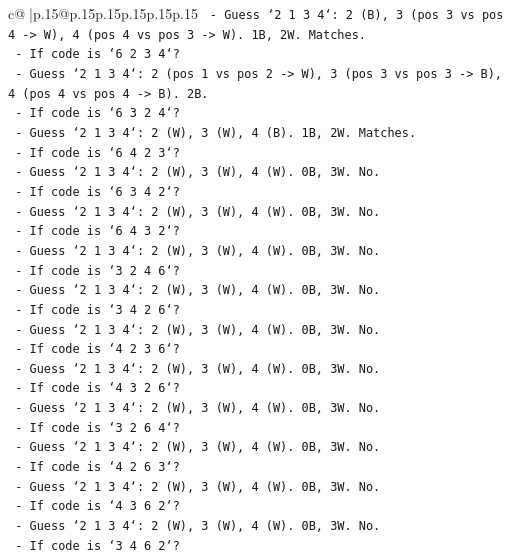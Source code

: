 \documentclass{article}
\begin{document}
{\begin{supertabular}{c@{$\;$}|p{.15\linewidth}@{}p{.15\linewidth}p{.15\linewidth}p{.15\linewidth}p{.15\linewidth}p{.15\linewidth}}
{{{\texttt{        {-} Guess `2 1 3 4`: 2 (B), 3 (pos 3 vs pos 4 {-}> W), 4 (pos 4 vs pos 3 {-}> W). 1B, 2W. Matches.} \\
\texttt{      {-} If code is `6 2 3 4`?} \\
\texttt{        {-} Guess `2 1 3 4`: 2 (pos 1 vs pos 2 {-}> W), 3 (pos 3 vs pos 3 {-}> B), 4 (pos 4 vs pos 4 {-}> B). 2B.} \\
\texttt{      {-} If code is `6 3 2 4`?} \\
\texttt{        {-} Guess `2 1 3 4`: 2 (W), 3 (W), 4 (B). 1B, 2W. Matches.} \\
\texttt{      {-} If code is `6 4 2 3`?} \\
\texttt{        {-} Guess `2 1 3 4`: 2 (W), 3 (W), 4 (W). 0B, 3W. No.} \\
\texttt{      {-} If code is `6 3 4 2`?} \\
\texttt{        {-} Guess `2 1 3 4`: 2 (W), 3 (W), 4 (W). 0B, 3W. No.} \\
\texttt{      {-} If code is `6 4 3 2`?} \\
\texttt{        {-} Guess `2 1 3 4`: 2 (W), 3 (W), 4 (W). 0B, 3W. No.} \\
\texttt{      {-} If code is `3 2 4 6`?} \\
\texttt{        {-} Guess `2 1 3 4`: 2 (W), 3 (W), 4 (W). 0B, 3W. No.} \\
\texttt{      {-} If code is `3 4 2 6`?} \\
\texttt{        {-} Guess `2 1 3 4`: 2 (W), 3 (W), 4 (W). 0B, 3W. No.} \\
\texttt{      {-} If code is `4 2 3 6`?} \\
\texttt{        {-} Guess `2 1 3 4`: 2 (W), 3 (W), 4 (W). 0B, 3W. No.} \\
\texttt{      {-} If code is `4 3 2 6`?} \\
\texttt{        {-} Guess `2 1 3 4`: 2 (W), 3 (W), 4 (W). 0B, 3W. No.} \\
\texttt{      {-} If code is `3 2 6 4`?} \\
\texttt{        {-} Guess `2 1 3 4`: 2 (W), 3 (W), 4 (W). 0B, 3W. No.} \\
\texttt{      {-} If code is `4 2 6 3`?} \\
\texttt{        {-} Guess `2 1 3 4`: 2 (W), 3 (W), 4 (W). 0B, 3W. No.} \\
\texttt{      {-} If code is `4 3 6 2`?} \\
\texttt{        {-} Guess `2 1 3 4`: 2 (W), 3 (W), 4 (W). 0B, 3W. No.} \\
\texttt{      {-} If code is `3 4 6 2`?} \\
}}}
\end{supertabular}}
\end{document}
